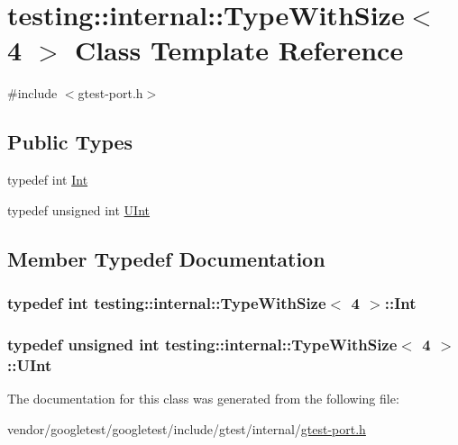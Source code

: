 \hypertarget{classtesting_1_1internal_1_1TypeWithSize_3_014_01_4}{}\section{testing\+:\+:internal\+:\+:Type\+With\+Size$<$ 4 $>$ Class Template Reference}
\label{classtesting_1_1internal_1_1TypeWithSize_3_014_01_4}


{\ttfamily \#include $<$gtest-\/port.\+h$>$}

\subsection*{Public Types}
\begin{DoxyCompactItemize}
\item 
typedef int \hyperlink{classtesting_1_1internal_1_1TypeWithSize_3_014_01_4_a80351860c00ed665e73f952143f4484a}{Int}
\item 
typedef unsigned int \hyperlink{classtesting_1_1internal_1_1TypeWithSize_3_014_01_4_a7d559570f830bf35d095eeb94d98de58}{U\+Int}
\end{DoxyCompactItemize}


\subsection{Member Typedef Documentation}
\subsubsection[{\texorpdfstring{Int}{Int}}]{\setlength{\rightskip}{0pt plus 5cm}typedef int {\bf testing\+::internal\+::\+Type\+With\+Size}$<$ 4 $>$\+::{\bf Int}}\hypertarget{classtesting_1_1internal_1_1TypeWithSize_3_014_01_4_a80351860c00ed665e73f952143f4484a}{}\label{classtesting_1_1internal_1_1TypeWithSize_3_014_01_4_a80351860c00ed665e73f952143f4484a}
\subsubsection[{\texorpdfstring{U\+Int}{UInt}}]{\setlength{\rightskip}{0pt plus 5cm}typedef unsigned int {\bf testing\+::internal\+::\+Type\+With\+Size}$<$ 4 $>$\+::{\bf U\+Int}}\hypertarget{classtesting_1_1internal_1_1TypeWithSize_3_014_01_4_a7d559570f830bf35d095eeb94d98de58}{}\label{classtesting_1_1internal_1_1TypeWithSize_3_014_01_4_a7d559570f830bf35d095eeb94d98de58}


The documentation for this class was generated from the following file\+:\begin{DoxyCompactItemize}
\item 
vendor/googletest/googletest/include/gtest/internal/\hyperlink{gtest-port_8h}{gtest-\/port.\+h}\end{DoxyCompactItemize}
